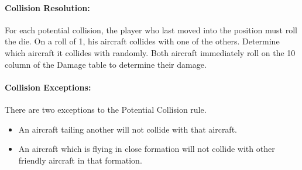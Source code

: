 \paragraph{Collision Resolution:} For each potential collision, the player who last moved into the position must roll the die. On a roll of 1, his aircraft collides with one of the others. Determine which aircraft it collides with randomly. Both aircraft immediately roll on the 10 column of the Damage table to determine their damage.

\paragraph{Collision Exceptions:} There are two exceptions to the Potential Collision rule.

\begin{itemize}
    \item An aircraft tailing another will not collide with that aircraft.
    \item An aircraft which is flying in close formation will not collide with other friendly aircraft in that formation.
\end{itemize}


